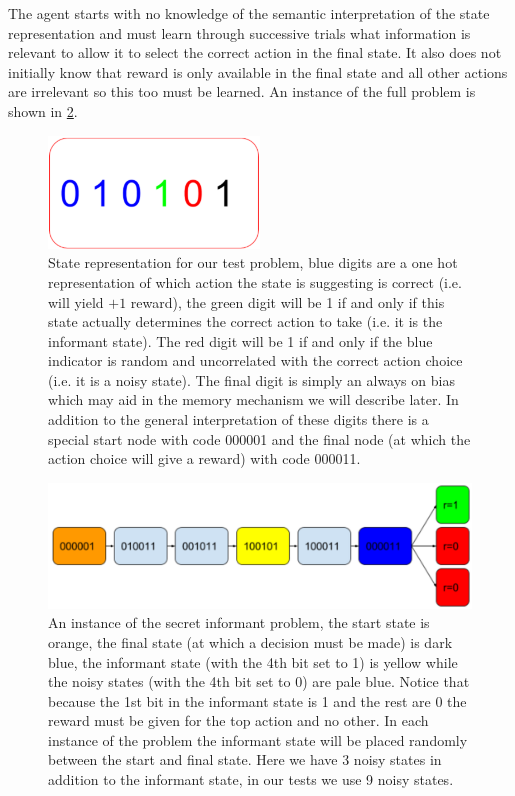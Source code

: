 \documentclass{article}
\begin{document}
The agent starts with no knowledge of the semantic interpretation of the state representation and must learn through successive trials what information is relevant to allow it to select the correct action in the final state. It also does not initially know that reward is only available in the final state and all other actions are irrelevant so this too must be learned. An instance of the full problem is shown in \ref{fig:problem}.
\begin{figure}[!ht]
\center
\includegraphics[width=0.5\textwidth]{images/state.png}
\caption{State representation for our test problem, blue digits are a one hot representation of which action the state is suggesting is correct (i.e. will yield $+1$ reward), the green digit will be 1 if and only if this state actually determines the correct action to take (i.e. it is the informant state). The red digit will be 1 if and only if the blue indicator is random and uncorrelated with the correct action choice (i.e. it is a noisy state). The final digit is simply an always on bias which may aid in the memory mechanism we will describe later. In addition to the general interpretation of these digits there is a special start node with code 000001 and the final node (at which the action choice will give a reward) with code 000011.}
\label{fig:state}
\end{figure}

\begin{figure}[!ht]
\includegraphics[width=1\textwidth]{images/problem.png}
\caption{An instance of the secret informant problem, the start state is orange, the final state (at which a decision must be made) is dark blue, the informant state (with the 4th bit set to 1) is yellow while the noisy states (with the 4th bit set to 0) are pale blue. Notice that because the 1st bit in the informant state is 1 and the rest are 0 the reward must be given for the top action and no other. In each instance of the problem the informant state will be placed randomly between the start and final state. Here we have 3 noisy states in addition to the informant state, in our tests we use 9 noisy states.}
\label{fig:problem}
\end{figure}
\end{document}

